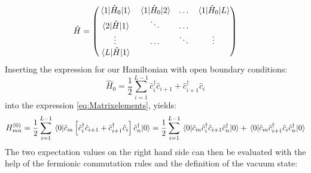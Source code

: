 \documentclass[11pt, a4paper, oneside]{book}
\theoremstyle{definition} %
\begin{document}
	\begin{equation}
	\hat{H} = 
	\begin{pmatrix}
 		\mel{1}{\hat{H}_0}{1} & \mel{1}{\hat{H}_0}{2} & \dots & \mel{1}{\hat{H}_0}{L} \\
 		\mel{2}{\hat{H}}{1} & \ddots &\dots \\
 		\vdots & \dots & \ddots & \vdots \\
 		\mel{L}{\hat{H}}{1}
 	\end{pmatrix}
	\end{equation}
		Inserting the expression for our Hamiltonian with open boundary conditions:
	\begin{equation}
		\hat{H}_0 = \frac{1}{2} \sum_{i=1}^{L-1} \hat{c}_i^\dagger \hat{c}_{i+1} + \hat{c}_{i+1}^\dagger \hat{c}_{i} 
	\end{equation}
	into the expression \ref{eq:Matrixelements}, yields:
	\begin{align}
	H_{mn}^{(0)} = \frac{1}{2}\sum_{i=1}^{L-1}\mel{0}{\hat{c}_m \left[ \hat{c}_i^\dagger \hat{c}_{i+1} + \hat{c}_{i+1}^\dagger \hat{c}_i\right]\hat{c}_n^\dagger}{0} = \frac{1}{2}\sum_{i=1}^{L-1} \mel{0}{\hat{c}_m \hat{c}_i^\dagger \hat{c}_{i+1} \hat{c}_n^\dagger}{0} + \mel{0}{\hat{c}_m \hat{c}_{i+1}^\dagger \hat{c}_i\hat{c}_n^\dagger}{0}
	\label{eq:Energy_Density_Matrix}
	\end{align}
 The two expectation values on the right hand side can then be evaluated with the help of the fermionic commutation rules and the definition of the vacuum state:
\end{document}
